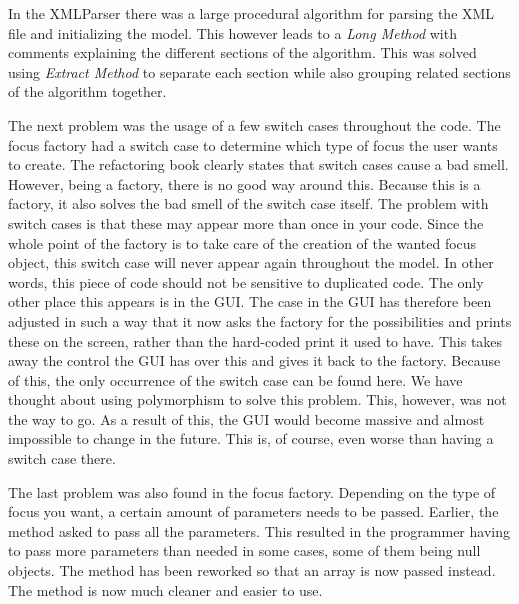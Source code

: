 				In the XMLParser there was a large procedural algorithm for parsing the XML file and initializing the model. This however leads to a \emph{Long Method} with comments explaining the different sections of the algorithm. This was solved using \emph{Extract Method} to separate each section while also grouping related sections of the algorithm together.
				
				The next problem was the usage of a few switch cases throughout the code. The focus factory had a switch case to determine which type of focus the user wants to create. The refactoring book clearly states that switch cases cause a bad smell. However, being a factory, there is no good way around this. Because this is a factory, it also solves the bad smell of the switch case itself. The problem with switch cases is that these may appear more than once in your code. Since the whole point of the factory is to take care of the creation of the wanted focus object, this switch case will never appear again throughout the model.  In other words, this piece of code should not be sensitive to duplicated code. The only other place this appears is in the GUI. The case in the GUI has therefore been adjusted in such a way that it now asks the factory for the possibilities and prints these on the screen, rather than the hard-coded print it used to have. This takes away the control the GUI has over this and gives it back to the factory. Because of this, the only occurrence of the switch case can be found here. 
				We have thought about using polymorphism to solve this problem. This, however, was not the way to go. As a result of this, the GUI would become massive and almost impossible to change in the future. This is, of course, even worse than having a switch case there.
				
				The last problem was also found in the focus factory. Depending on the type of focus you want, a certain amount of parameters needs to be passed. Earlier, the method asked to pass all the parameters. This resulted in the programmer having to pass more parameters than needed in some cases, some of them being null objects. The method has been reworked so that an array is now passed instead. The method is now much cleaner and easier to use.
				
